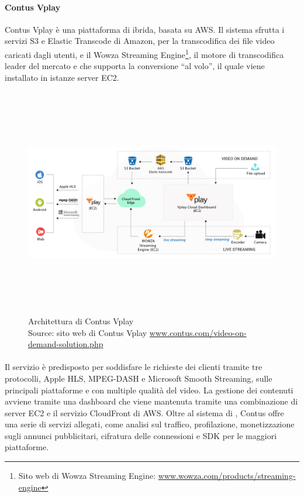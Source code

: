 		\paragraph{Contus Vplay}
		Contus Vplay è una piattaforma di  ibrida, basata su \gls{AWS}. Il sistema sfrutta i servizi \gls{S3} e Elastic Transcode di Amazon, per la transcodifica dei file video caricati dagli utenti, e il Wowza Streaming Engine\footnote{Sito web di Wowza Streaming Engine: \href{https://www.wowza.com/products/streaming-engine}{www.wowza.com/products/streaming-engine}}, il motore di transcodifica leader del mercato e che supporta la conversione ``al volo'', il quale viene installato in istanze server \gls{EC2}.
		\begin{figure}[H]
			\begin{center}
				\includegraphics[width=16.5cm,height=10cm,keepaspectratio]{immagini/contus-vplay-cloud-architecture.jpg}
				\caption[Architettura di Contus Vplay]{Architettura di Contus Vplay
				\\
				Source: sito web di Contus Vplay \href{http://www.contus.com/video-on-demand-solution.php}{www.contus.com/video-on-demand-solution.php}}
			\end{center}
		\end{figure}
		\paragraph*{} Il servizio è predisposto per soddisfare le richieste dei clienti tramite tre protocolli, Apple \gls{HLS}, \gls{MPEG-DASH} e Microsoft Smooth Streaming, sulle principali piattaforme e con multiple qualità del video. La gestione dei contenuti avviene tramite una dashboard che viene mantenuta tramite una combinazione di server \gls{EC2} e il servizio CloudFront di \gls{AWS}. Oltre al sistema di , Contus offre una serie di servizi allegati, come analisi sul traffico, profilazione, monetizzazione sugli annunci pubblicitari, cifratura delle connessioni e \gls{SDK} per le maggiori piattaforme.
	

